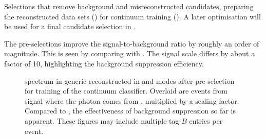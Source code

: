 \begin{table}[htbp!]
    \centering
    \caption{\label{tab:preselections} Selections that remove background and misreconstructed candidates,
    preparing the reconstructed data sets () for continuum \BDT training ().
    A later optimisation will be used for a final candidate selection in .
    }
    
\end{table}

The pre-selections improve the signal-to-background ratio by roughly an order of magnitude.
This is seen by comparing  with .
The \BtoXsgamma signal \MC scale differs by about a factor of 10, highlighting the background suppression efficiency.

\begin{figure}[htbp!]
    \centering
    \caption{\label{fig:preselected_photons} \BtoXsgamma spectrum in generic \MC reconstructed in \feiBp and \feiBz modes
    after pre-selection for training of the continuum \BDT classifier.
    Overlaid are events from signal \MC where the photon comes from \BtoXsgamma, multiplied by a scaling factor.
    Compared to , the effectiveness of background suppression so far is apparent.
    These figures may include multiple tag-$B$ entries per event.
    }
\end{figure}

